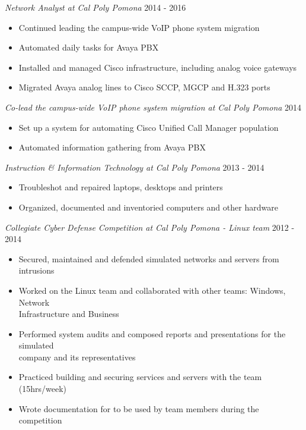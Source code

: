 \documentclass[line]{tex/res}
\begin{document}
\begin{resume}

    {\sl Network Analyst at Cal Poly Pomona} \hfill 2014 - 2016
    \begin{itemize} \itemsep -2pt
        \item Continued leading the campus-wide VoIP phone system migration
        \item Automated daily tasks for Avaya PBX
        \item Installed and managed Cisco infrastructure, including analog voice gateways
        \item Migrated Avaya analog lines to Cisco SCCP, MGCP and H.323 ports
    \end{itemize}

    {\sl Co-lead the campus-wide VoIP phone system migration at Cal Poly Pomona} \hfill 2014
    \begin{itemize} \itemsep -2pt
        \item Set up a system for automating Cisco Unified Call Manager population
        \item Automated information gathering from Avaya PBX
    \end{itemize}

    {\sl Instruction \& Information Technology at Cal Poly Pomona} \hfill 2013 - 2014
    \begin{itemize} \itemsep -2pt
        \item Troubleshot and repaired laptops, desktops and printers
        \item Organized, documented and inventoried computers and other hardware
    \end{itemize}

    {\sl Collegiate Cyber Defense Competition at Cal Poly Pomona - Linux team} \hfill 2012 - 2014
    \begin{itemize} \itemsep -2pt
        \item Secured, maintained and defended simulated networks and servers from intrusions
        \item Worked on the Linux team and collaborated with other teams: Windows, Network \\
            Infrastructure and Business
        \item Performed system audits and composed reports and presentations for the simulated \\
            company and its representatives
        \item Practiced building and securing services and servers with the team (15hrs/week)
        \item Wrote documentation for to be used by team members during the competition
    \end{itemize}


\end{resume}
\end{document}
